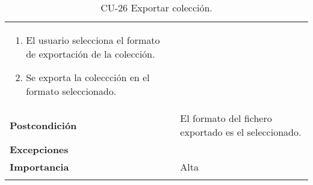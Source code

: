\begin{longtable}[]{@{}ll@{}}
\begin{minipage}[t]{0.68\columnwidth}
\begin{enumerate}
\tightlist
\item
  El usuario selecciona el formato de exportación de la colección.
\item
  Se exporta la coleccción en el formato seleccionado.
\end{enumerate}\strut
\end{minipage}\tabularnewline
\begin{minipage}[t]{0.26\columnwidth}\raggedright
\textbf{Postcondición}\strut
\end{minipage} & \begin{minipage}[t]{0.68\columnwidth}\raggedright
El formato del fichero exportado es el seleccionado.\strut
\end{minipage}\tabularnewline
\begin{minipage}[t]{0.26\columnwidth}\raggedright
\textbf{Excepciones}\strut
\end{minipage} & \begin{minipage}[t]{0.68\columnwidth}\raggedright
\strut
\end{minipage}\tabularnewline
\begin{minipage}[t]{0.26\columnwidth}\raggedright
\textbf{Importancia}\strut
\end{minipage} & \begin{minipage}[t]{0.68\columnwidth}\raggedright
Alta\strut
\end{minipage}\tabularnewline
\bottomrule
\caption{CU-26 Exportar colección.}
\end{longtable}

